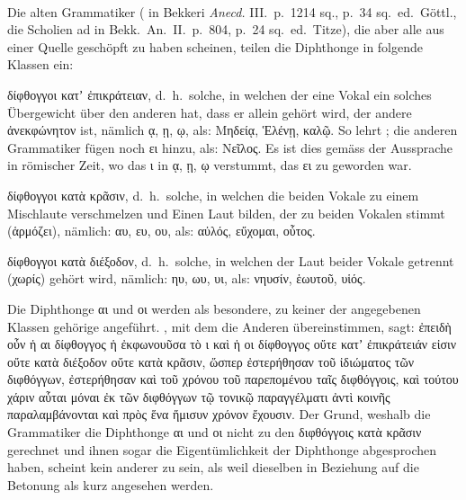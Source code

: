 \paragraph{} Die alten Grammatiker ( in Bekkeri \emph{Anecd.}
III.\ p.\ 1214 sq.,  p.\ 34 sq.\ ed.\ Göttl., die
Scholien ad  in Bekk.\ An.\ II.\ p.\ 804,
 p.\ 24 sq.\ ed.\ Titze), die aber alle aus einer Quelle
geschöpft zu haben scheinen, teilen die Diphthonge in folgende Klassen ein:
\begin{compactenum}[(a)]
	\item δίφθογγοι κατʼ ἐπικράτειαν, d.~h.\ solche, in welchen der eine Vokal ein
	solches Übergewicht über den anderen hat, dass er allein gehört wird, der
	andere ἀνεκφώνητον ist, nämlich ᾳ, ῃ, ῳ, als: Μηδείᾳ, Ἑλένῃ, καλῷ. So lehrt
	; die anderen Grammatiker fügen noch ει hinzu, als:
	Νεῖλος. Es ist dies gemäss der Aussprache in römischer Zeit, wo das ι in ᾳ, ῃ,
	ῳ verstummt, das ει zu  geworden war.
	\item δίφθογγοι κατὰ κρᾶσιν, d.~h.\ solche, in welchen die beiden Vokale zu einem
	Mischlaute verschmelzen und Einen Laut bilden, der zu beiden Vokalen stimmt
	(ἁρμόζει), nämlich: αυ, ευ, ου, als: αὐλός, εὔχομαι, οὗτος.
	\item δίφθογγοι
	κατὰ διέξοδον, d.~h.\ solche, in welchen der Laut beider Vokale getrennt
	(χωρίς) gehört wird, nämlich: ηυ, ωυ, υι, als: νηυσίν, ἑωυτοῦ, υἱός.
	\item Die Diphthonge αι und οι werden als besondere, zu keiner der angegebenen
	Klassen gehörige angeführt.
	, mit dem die Anderen
	übereinstimmen, sagt: ἐπειδὴ οὖν ἡ αι δίφθογγος ἡ ἐκφωνουῦσα τὸ ι καὶ ἡ οι
	δίφθογγος οὔτε κατʼ ἐπικράτειάν εἰσιν οὔτε κατὰ διέξοδον οὔτε κατὰ κρᾶσιν,
	ὥσπερ ἐστερήθησαν τοῦ ἰδιώματος τῶν διφθόγγων, ἐστερήθησαν καὶ τοῦ χρόνου
	τοῦ παρεπομένου ταῖς διφθόγγοις, καὶ τούτου χάριν αὗται μόναι ἐκ τῶν
	διφθόγγων τῷ τονικῷ παραγγέλματι ἀντὶ κοινῆς παραλαμβάνονται καὶ πρὸς ἕνα
	ἥμισυν χρόνον ἔχουσιν. Der Grund, weshalb die Grammatiker die Diphthonge αι
	und οι nicht zu den διφθόγγοις κατὰ κρᾶσιν gerechnet und ihnen sogar die
	Eigentümlichkeit der Diphthonge abgesprochen haben, scheint kein anderer zu
	sein, als weil dieselben in Beziehung auf die Betonung als kurz angesehen
	werden.
\end{compactenum}

